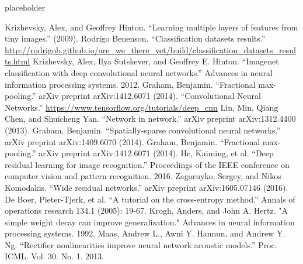 \documentclass[conference]{IEEEtran}
\begin{document}
placeholder



\begin{thebibliography}{00}
 Krizhevsky, Alex, and Geoffrey Hinton. ``Learning multiple layers of features from tiny images.'' (2009).
 Rodrigo Benenson. ``Classification datasets results.'' \url{http://rodrigob.github.io/are_we_there_yet/build/classification_datasets_results.html}
Krizhevsky, Alex, Ilya Sutskever, and Geoffrey E. Hinton. ``Imagenet classification with deep convolutional neural networks.'' Advances in neural information processing systems. 2012.
 Graham, Benjamin. ``Fractional max-pooling.'' arXiv preprint arXiv:1412.6071 (2014).
 ``Convolutional Neural Networks.'' \url{ https://www.tensorflow.org/tutorials/deep_cnn}
 Lin, Min, Qiang Chen, and Shuicheng Yan. ``Network in network.'' arXiv preprint arXiv:1312.4400 (2013).
 Graham, Benjamin. ``Spatially-sparse convolutional neural networks.'' arXiv preprint arXiv:1409.6070 (2014).
 Graham, Benjamin. ``Fractional max-pooling.'' arXiv preprint arXiv:1412.6071 (2014).
 He, Kaiming, et al. ``Deep residual learning for image recognition.'' Proceedings of the IEEE conference on computer vision and pattern recognition. 2016.
 Zagoruyko, Sergey, and Nikos Komodakis. ``Wide residual networks.'' arXiv preprint arXiv:1605.07146 (2016).
 De Boer, Pieter-Tjerk, et al. ``A tutorial on the cross-entropy method.'' Annals of operations research 134.1 (2005): 19-67.
 Krogh, Anders, and John A. Hertz. "A simple weight decay can improve generalization." Advances in neural information processing systems. 1992.
 Maas, Andrew L., Awni Y. Hannun, and Andrew Y. Ng. ``Rectifier nonlinearities improve neural network acoustic models.'' Proc. ICML. Vol. 30. No. 1. 2013.
\end{thebibliography}
\end{document}

